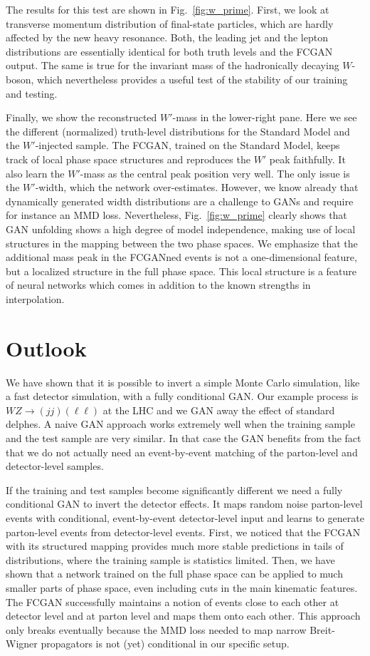 The results for this test are shown in Fig.~\ref{fig:w_prime}. First,
we look at transverse momentum distribution of final-state particles,
which are hardly affected by the new heavy resonance. Both, the
leading jet and the lepton distributions are essentially identical for
both truth levels and the FCGAN output. The same is true for the
invariant mass of the hadronically decaying $W$-boson, which
nevertheless provides a useful test of the stability of our training
and testing.

Finally, we show the reconstructed $W'$-mass in the lower-right
pane. Here we see the different (normalized) truth-level distributions
for the Standard Model and the $W'$-injected sample. The FCGAN,
trained on the Standard Model, keeps track of local phase space
structures and reproduces the $W'$ peak faithfully. It also learn the
$W'$-mass as the central peak position very well. The only issue is
the $W'$-width, which the network over-estimates. However, we know
already that dynamically generated width distributions are a challenge
to GANs and require for instance an MMD loss.  Nevertheless,
Fig.~\ref{fig:w_prime} clearly shows that GAN unfolding shows a high
degree of model independence, making use of local structures in the
mapping between the two phase spaces. We emphasize that the additional
mass peak in the FCGANned events is not a one-dimensional feature, but
a localized structure in the full phase space. This local structure is
a feature of neural networks which comes in addition to the known
strengths in interpolation.

\section{Outlook}
We have shown that it is possible to invert a simple Monte Carlo
simulation, like a fast detector simulation, with a fully conditional
GAN. Our example process is $WZ \to (jj) (\ell \ell)$ at the LHC and
we GAN away the effect of standard delphes. A naive GAN approach
works extremely well when the training sample and the test sample are
very similar. In that case the GAN benefits from the fact that we do
not actually need an event-by-event matching of the parton-level and
detector-level samples.

If the training and test samples become significantly different we
need a fully conditional GAN to invert the detector effects. It maps
random noise parton-level events with conditional, event-by-event
detector-level input and learns to generate parton-level events from
detector-level events.  First, we noticed that the FCGAN with its
structured mapping provides much more stable predictions in tails of
distributions, where the training sample is statistics limited.  Then,
we have shown that a network trained on the full phase space can be
applied to much smaller parts of phase space, even including cuts in
the main kinematic features. The FCGAN successfully maintains a notion
of events close to each other at detector level and at parton level
and maps them onto each other. This approach only breaks eventually
because the MMD loss needed to map narrow Breit-Wigner propagators is
not (yet) conditional in our specific setup.


